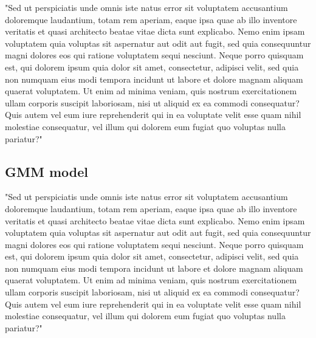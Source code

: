 \documentclass[9pt,twoside,lineno]{pnas-new}
\begin{document}
"Sed ut perspiciatis unde omnis iste natus error sit voluptatem accusantium doloremque laudantium, totam rem aperiam, eaque ipsa quae ab illo inventore veritatis et quasi architecto beatae vitae dicta sunt explicabo. Nemo enim ipsam voluptatem quia voluptas sit aspernatur aut odit aut fugit, sed quia consequuntur magni dolores eos qui ratione voluptatem sequi nesciunt. Neque porro quisquam est, qui dolorem ipsum quia dolor sit amet, consectetur, adipisci velit, sed quia non numquam eius modi tempora incidunt ut labore et dolore magnam aliquam quaerat voluptatem. Ut enim ad minima veniam, quis nostrum exercitationem ullam corporis suscipit laboriosam, nisi ut aliquid ex ea commodi consequatur? Quis autem vel eum iure reprehenderit qui in ea voluptate velit esse quam nihil molestiae consequatur, vel illum qui dolorem eum fugiat quo voluptas nulla pariatur?"

\subsection*{GMM model}
"Sed ut perspiciatis unde omnis iste natus error sit voluptatem accusantium doloremque laudantium, totam rem aperiam, eaque ipsa quae ab illo inventore veritatis et quasi architecto beatae vitae dicta sunt explicabo. Nemo enim ipsam voluptatem quia voluptas sit aspernatur aut odit aut fugit, sed quia consequuntur magni dolores eos qui ratione voluptatem sequi nesciunt. Neque porro quisquam est, qui dolorem ipsum quia dolor sit amet, consectetur, adipisci velit, sed quia non numquam eius modi tempora incidunt ut labore et dolore magnam aliquam quaerat voluptatem. Ut enim ad minima veniam, quis nostrum exercitationem ullam corporis suscipit laboriosam, nisi ut aliquid ex ea commodi consequatur? Quis autem vel eum iure reprehenderit qui in ea voluptate velit esse quam nihil molestiae consequatur, vel illum qui dolorem eum fugiat quo voluptas nulla pariatur?"
\end{document}
